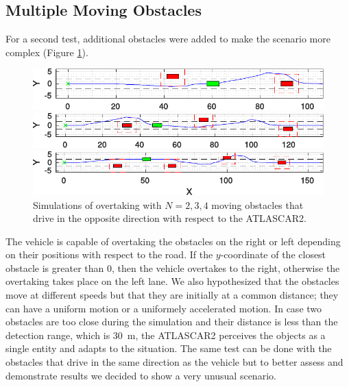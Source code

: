 \subsection{Multiple Moving Obstacles}
For a second test, additional obstacles were added to make the scenario more complex (Figure \ref{fig:obstacleAvoidance_random}).
\begin{figure}[!h]
	\centering
	\begin{minipage}[t]{\textwidth}
		\includegraphics[width=\textwidth]{./figure/random_N_obstacles/overtaking_random_2.pdf}
	\end{minipage}
	\begin{minipage}[t]{\textwidth}
		\includegraphics[width=\textwidth]{./figure/random_N_obstacles/overtaking_random.pdf}
	\end{minipage}
	\begin{minipage}[t]{\textwidth}
		\includegraphics[width=\textwidth]{./figure/random_N_obstacles/overtaking_random_1.pdf}
	\end{minipage}
	\caption{Simulations of overtaking with $N = 2,3,4$ moving obstacles that drive in the opposite direction with respect to the ATLASCAR2.}
	\label{fig:obstacleAvoidance_random}
\end{figure}

The vehicle is capable of overtaking the obstacles on the right or left depending on their positions with respect to the road. If the $y$-coordinate of the closest obstacle is greater than 0, then the vehicle overtakes to the right, otherwise the overtaking takes place on the left lane. We also hypothesized that the obstacles move at different speeds but that they are initially at a common distance; they can have a uniform motion or a uniformely accelerated motion. In case two obstacles are too close during the simulation and their distance is less than the detection range, which is \SI{30}{m}, the ATLASCAR2 perceives the objects as a single entity and adapts to the situation. The same test can be done with the obstacles that drive in the same direction as the vehicle but to better assess and demonstrate results we decided to show a very unusual scenario.

